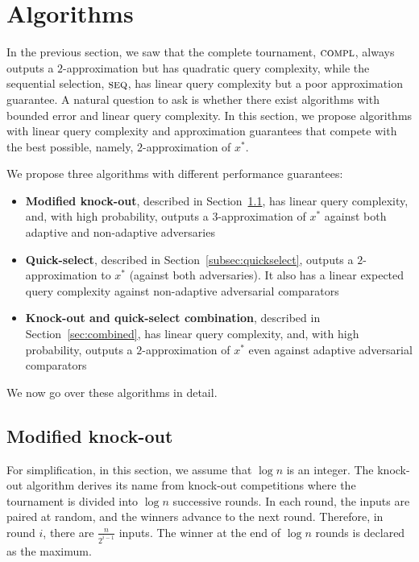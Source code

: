 \documentclass[twoside,11pt]{article}
\newcommand{\algorithms}[1]{\textsc{#1}}
\newcommand{\algseq}{\algorithms{seq}}
\newcommand{\algcomp}{\algorithms{compl}}
\newcommand{\maxx}{x^*}
\begin{document}
\section{Algorithms}
\label{sec:algorithm}
In the previous section, we saw that the complete tournament,
$\algcomp$, always outputs a $2$-approximation but has quadratic
query complexity, while the sequential selection, $\algseq$, has
linear query complexity but a poor approximation guarantee.  A natural
question to ask is whether there exist algorithms with bounded error
and linear query complexity.  In this section, we propose algorithms
with linear query complexity and approximation guarantees that compete
with the best possible, namely, $2$-approximation of $\maxx$.

We propose three algorithms with different
performance guarantees:
\begin{itemize}
\item
{\bf Modified knock-out}, described in Section~\ref{subsec:knockout},
has linear query complexity, and, with high probability, outputs a
$3$-approximation of $\maxx$ against both adaptive and non-adaptive adversaries
\item
{\bf Quick-select}, described in
Section~\ref{subsec:quickselect}, outputs a $2$-approximation to $\maxx$ (against both adversaries). It also has a linear expected query complexity against  non-adaptive adversarial comparators
\item
{\bf Knock-out and quick-select combination}, described 
in Section~\ref{sec:combined}, has linear query
complexity, and, with high probability, outputs a $2$-approximation of
$\maxx$ even against  adaptive adversarial comparators
\end{itemize}

\noindent We now go over these algorithms in detail.
\subsection{Modified knock-out}
\label{subsec:knockout}
For simplification, in this section, we assume that $\log n$ is
an integer.  The knock-out algorithm derives its name from knock-out
competitions where the tournament is divided into $\log n$ successive
rounds. In each round, the inputs are paired at random, and the winners
advance to the next round. Therefore, in round $i$, there are
$\frac{n}{2^{i-1}}$ inputs. The winner at the end of $\log n$
rounds is declared as the maximum.
\end{document}

